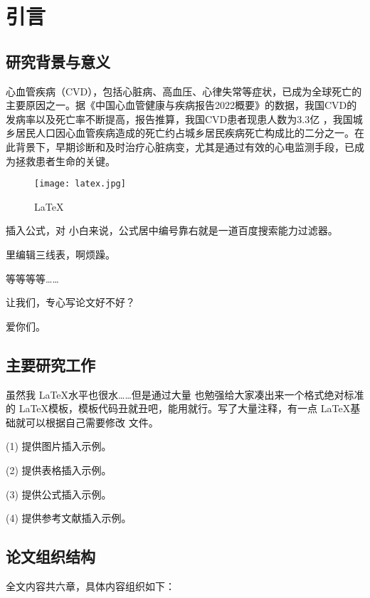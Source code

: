 \section{引言}
\subsection{研究背景与意义}

心血管疾病（CVD），包括心脏病、高血压、心律失常等症状，已成为全球死亡的主要原因之一。据《中国心血管健康与疾病报告2022概要》的数据，我国CVD的发病率以及死亡率不断提高，报告推算，我国CVD患者现患人数为3.3亿 \cite{中国心血管健康与疾病报告2022概要} ，我国城乡居民人口因心血管疾病造成的死亡约占城乡居民疾病死亡构成比的二分之一。在此背景下，早期诊断和及时治疗心脏病变，尤其是通过有效的心电监测手段，已成为拯救患者生命的关键。

\begin{figure}[hbt]
    \centering
    \texttt{[image: latex.jpg]}
    \caption{LaTeX}
    \label{F.latex}
\end{figure}

插入公式，对  小白来说，公式居中编号靠右就是一道百度搜索能力过滤器。

 里编辑三线表，啊烦躁。

等等等等……

让我们，专心写论文好不好？

爱你们。


\subsection{主要研究工作}
虽然我 \LaTeX 水平也很水……但是通过大量  也勉强给大家凑出来一个格式绝对标准的 \LaTeX 模板，模板代码丑就丑吧，能用就行。写了大量注释，有一点 \LaTeX 基础就可以根据自己需要修改  文件。

(1) 提供图片插入示例。

(2) 提供表格插入示例。

(3) 提供公式插入示例。

(4) 提供参考文献插入示例。

\subsection{论文组织结构}

全文内容共六章，具体内容组织如下：

